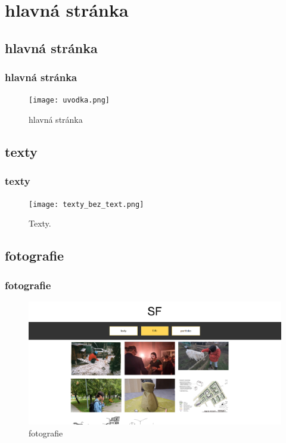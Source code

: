 \section{hlavná stránka}
\subsection{hlavná stránka}
\label{hlavná stránka}
\begin{frame}\frametitle{hlavná stránka}
  \begin{figure}[htb]
    \centering
    \texttt{[image: uvodka.png]}
    \caption{hlavná stránka}
  \end{figure}

\end{frame}

\subsection{texty}
\begin{frame}\frametitle{texty}
  \begin{figure}[htb]
    \centering
    \texttt{[image: texty\_bez\_text.png]}
    \caption{Texty.}\label{OBRAZOK 2.1.1}
  \end{figure}

\end{frame}

\subsection{fotografie}
\begin{frame}\frametitle{fotografie}
  \begin{figure}[htb]
    \centering
    \includegraphics[scale=0.3]{galeria.png}
    \caption{fotografie}
  \end{figure}

\end{frame}

